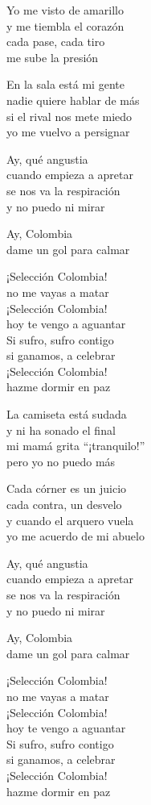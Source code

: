 \begin{lyrics}
Yo me visto de amarillo\\
y me tiembla el corazón\\
cada pase, cada tiro\\
me sube la presión

En la sala está mi gente\\
nadie quiere hablar de más\\
si el rival nos mete miedo\\
yo me vuelvo a persignar

Ay, qué angustia\\
cuando empieza a apretar\\
se nos va la respiración\\
y no puedo ni mirar

Ay, Colombia\\
dame un gol para calmar

¡Selección Colombia!\\
no me vayas a matar\\
¡Selección Colombia!\\
hoy te vengo a aguantar\\
Si sufro, sufro contigo\\
si ganamos, a celebrar\\
¡Selección Colombia!\\
hazme dormir en paz

La camiseta está sudada\\
y ni ha sonado el final\\
mi mamá grita “¡tranquilo!”\\
pero yo no puedo más

Cada córner es un juicio\\
cada contra, un desvelo\\
y cuando el arquero vuela\\
yo me acuerdo de mi abuelo

Ay, qué angustia\\
cuando empieza a apretar\\
se nos va la respiración\\
y no puedo ni mirar

Ay, Colombia\\
dame un gol para calmar

¡Selección Colombia!\\
no me vayas a matar\\
¡Selección Colombia!\\
hoy te vengo a aguantar\\
Si sufro, sufro contigo\\
si ganamos, a celebrar\\
¡Selección Colombia!\\
hazme dormir en paz


\end{lyrics}
